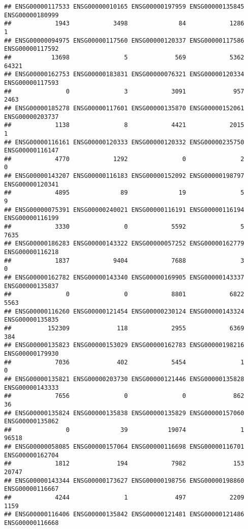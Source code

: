 \documentclass[
]{article}
\begin{document}
\begin{verbatim}
## ENSG00000117533 ENSG00000010165 ENSG00000197959 ENSG00000135845 ENSG00000180999 
##            1943            3498              84            1286               1 
## ENSG00000094975 ENSG00000117560 ENSG00000120337 ENSG00000117586 ENSG00000117592 
##           13698               5             569            5362           64321 
## ENSG00000162753 ENSG00000183831 ENSG00000076321 ENSG00000120334 ENSG00000117593 
##               0               3            3091             957            2463 
## ENSG00000185278 ENSG00000117601 ENSG00000135870 ENSG00000152061 ENSG00000203737 
##            1138               8            4421            2015               1 
## ENSG00000116161 ENSG00000120333 ENSG00000120332 ENSG00000235750 ENSG00000116147 
##            4770            1292               0               2               0 
## ENSG00000143207 ENSG00000116183 ENSG00000152092 ENSG00000198797 ENSG00000120341 
##            4895              89              19               5               9 
## ENSG00000075391 ENSG00000240021 ENSG00000116191 ENSG00000116194 ENSG00000116199 
##            3330               0            5592               5            7635 
## ENSG00000186283 ENSG00000143322 ENSG00000057252 ENSG00000162779 ENSG00000116218 
##            1837            9404            7688               3               0 
## ENSG00000162782 ENSG00000143340 ENSG00000169905 ENSG00000143337 ENSG00000135837 
##               0               0            8801            6822            5563 
## ENSG00000116260 ENSG00000121454 ENSG00000230124 ENSG00000143324 ENSG00000135835 
##          152309             118            2955            6369             384 
## ENSG00000135823 ENSG00000153029 ENSG00000162783 ENSG00000198216 ENSG00000179930 
##            7036             402            5454               1               0 
## ENSG00000135821 ENSG00000203730 ENSG00000121446 ENSG00000135828 ENSG00000143333 
##            7656               0               0             862              36 
## ENSG00000135824 ENSG00000135838 ENSG00000135829 ENSG00000157060 ENSG00000135862 
##               0              39           19074               1           96518 
## ENSG00000058085 ENSG00000157064 ENSG00000116698 ENSG00000116701 ENSG00000162704 
##            1812             194            7982             153           20747 
## ENSG00000143344 ENSG00000173627 ENSG00000198756 ENSG00000198860 ENSG00000116667 
##            4244               1             497            2209            1159 
## ENSG00000116406 ENSG00000135842 ENSG00000121481 ENSG00000121486 ENSG00000116668 

\end{verbatim}
\end{document}

